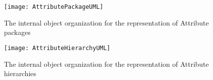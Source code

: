 \begin{figure}[h]
\centering
\texttt{[image: AttributePackageUML]}
\caption{The internal object organization for the representation of Attribute packages}
\label{fig:AttributePackageUML}
\end{figure}
\clearpage

\begin{figure}[h]
\centering
\texttt{[image: AttributeHierarchyUML]}
\caption{The internal object organization for the representation of Attribute hierarchies}
\label{fig:AttributeHierarchyUML}
\end{figure}
\clearpage
